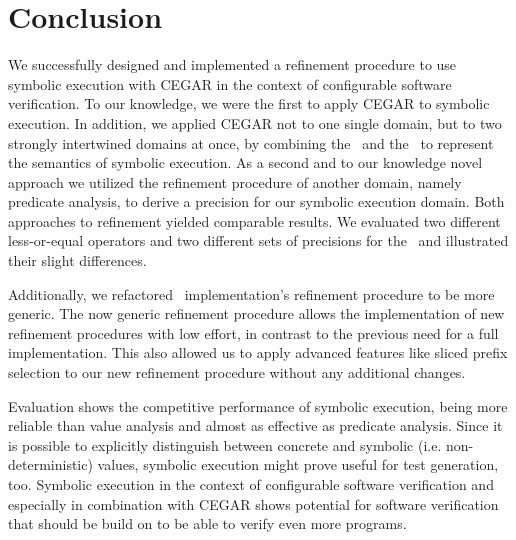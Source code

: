 \chapter{Conclusion}
We successfully designed and implemented a refinement procedure to use symbolic execution with CEGAR in the context of configurable software verification.
To our knowledge, we were the first to apply CEGAR to symbolic execution.
In addition, we applied CEGAR not to one single domain, but to two strongly intertwined domains at once, by combining the \symbolicValueAnalysisCPA\ and the \constraintsCPA\ to represent the semantics of symbolic execution.
As a second and to our knowledge novel approach we utilized the refinement procedure of another domain, namely predicate analysis, to derive a precision for our symbolic execution domain.
Both approaches to refinement yielded comparable results.
We evaluated two different less-or-equal operators and two different sets of precisions for the \constraintsCPA\ and illustrated their slight differences.

Additionally, we refactored \ implementation's refinement procedure to be more generic.
The now generic refinement procedure allows the implementation of new refinement procedures with low effort, in contrast to the previous need for a full implementation.
This also allowed us to apply advanced features like sliced prefix selection to our new refinement procedure without any additional changes.

Evaluation shows the competitive performance of symbolic execution, being more reliable than value analysis and almost as effective as predicate analysis.
Since it is possible to explicitly distinguish between concrete and symbolic (i.e. non-deterministic) values, symbolic execution might prove useful for test generation, too.
Symbolic execution in the context of configurable software verification and especially in combination with CEGAR shows potential for software verification that should be build on to be able to verify even more programs.
